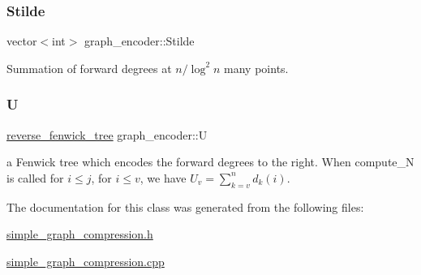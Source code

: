 \subsubsection{\texorpdfstring{Stilde}{Stilde}}
{\footnotesize\ttfamily vector$<$int$>$ graph\+\_\+encoder\+::\+Stilde\hspace{0.3cm}{\ttfamily [private]}}



Summation of forward degrees at $n / \log^2 n$ many points. 

\mbox{\label{classgraph__encoder_a3314c40920f2ee132958a6b0ce7e7995}} 
\subsubsection{\texorpdfstring{U}{U}}
{\footnotesize\ttfamily \hyperlink{classreverse__fenwick__tree}{reverse\+\_\+fenwick\+\_\+tree} graph\+\_\+encoder\+::U\hspace{0.3cm}{\ttfamily [private]}}



a Fenwick tree which encodes the forward degrees to the right. When compute\+\_\+N is called for $i \leq j$, for $i \leq v$, we have $U_v = \sum_{k=v}^n d_k(i)$. 



The documentation for this class was generated from the following files\+:\begin{DoxyCompactItemize}
\item 
\hyperlink{simple__graph__compression_8h}{simple\+\_\+graph\+\_\+compression.\+h}\item 
\hyperlink{simple__graph__compression_8cpp}{simple\+\_\+graph\+\_\+compression.\+cpp}\end{DoxyCompactItemize}
